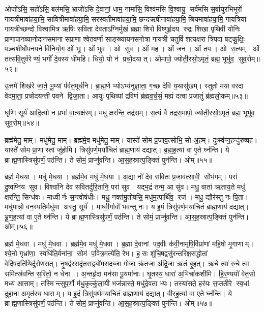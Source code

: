 ओजो॑ऽसि॒ सहो॑ऽसि॒ बल॑मसि॒ भ्राजो॑ऽसि दे॒वानां॒ धाम॒ नामा॑सि॒ विश्व॑मसि वि॒श्वायु॒ सर्व॑मसि स॒र्वायुरभिभूरों गायत्रीमावा॑हया॒मि॒ सावित्रीमावा॑हया॒मि॒ सरस्वतीमावा॑ह\-या॒मि॒ छन्दऋषीनावा॑हया॒मि॒ श्रियमावा॑हया॒मि॒ गायत्रिया गायत्रीच्छन्दो विश्वामित्र ऋषिः सविता देवताऽग्निर्मुखं ब्रह्मा शिरो विष्णुर्\mbox{}हृदय रुद्रः शिखा पृथिवी योनिः प्राणापानव्यानोदानसमाना सप्राणा श्वेतवर्णा साङ्ख्यायनसगोत्रा गायत्री चतुर्विशत्यक्षरा त्रिपदा॑ षट्कु॒क्षिः॒ पञ्चशीर्\mbox{}षोपनयने वि॑नियो॒ग॒ ओं भूः। 
ओं भुव। 
ओ सुव। 
ओं मह। 
ओं जन। 
ओं तप। 
ओ स॒त्यम्। 
ओं तत्स॑वि॒तुर्वरेण्यं॒ भर्गो॑ दे॒वस्य॑ धीमहि। 
धियो॒ यो न॑ प्रचो॒दयात्। 
ओमापो॒ ज्योती॒रसो॒ऽमृतं॒ ब्रह्म॒ भूर्भुव॒ सुव॒रोम्॥५२॥
\anuvakamend

उ॒त्तमे॑ शिख॑रे जा॒ते॒ भू॒म्यां प॑र्वत॒मूर्ध॑नि। 
ब्रा॒ह्म॒णेभ्योऽभ्य॑नु\-ज्ञा॒ता॒ ग॒च्छ दे॑वि य॒थासु॑खम्। 
स्तुतो मया वरदा वे॑दमा॒ता॒ प्रचोदयन्ती पवने द्विजा॒ता। 
आयुः पृथिव्यां द्रविणं ब्र॑ह्मव॒र्च॒सं॒ मह्यं दत्वा प्रजातुं ब्र॑ह्मलो॒कम्॥५३॥
\anuvakamend

घृणिः सूर्य॑ आदि॒त्यो न प्रभा॑ वा॒त्यक्ष॑रम्। 
मधु॑ क्षरन्ति॒ तद्र॑सम्। 
स॒त्यं वै तद्रस॒मापो॒ ज्योती॒रसो॒ऽमृतं॒ ब्रह्म॒ भूर्भुव॒ सुव॒रोम्॥५४॥\anuvakamend

ब्रह्म॑मेतु॒ माम्। 
मधु॑मेतु॒ माम्। 
ब्रह्म॑मे॒व मधु॑मेतु॒ माम्। 
यास्ते॑ सोम प्र॒जाव॒त्सोभि॒ सो अ॒हम्। 
दुःस्व॑प्न॒हन्दु॑रुष्षह। 
यास्ते॑ सोम प्रा॒णास्तां जु॑होमि। 
त्रिसु॑पर्ण॒मया॑चितं ब्राह्म॒णाय॑ दद्यात्। 
ब्र॒ह्म॒ह॒त्यां वा ए॒ते घ्न॑न्ति। 
ये ब्राह्म॒णास्त्रिसु॑पर्णं॒ पठ॑न्ति। 
ते सोमं॒ प्राप्नु॑वन्ति। 
आ॒स॒ह॒स्रात्प॒ङ्क्तिं पुन॑न्ति। 
ओम्॥५५॥
\anuvakamend

ब्रह्म॑ मे॒धया। 
मधु॑ मे॒धया। 
ब्रह्म॑मे॒व मधु॑ मे॒धया। 
अ॒द्या नो॑ देव सवितः प्र॒जाव॑त्सावी॒ सौभ॑गम्। 
परा॑ दु॒ष्वप्नि॑य सुव। 
विश्वा॑नि देव सवितर्दुरि॒तानि॒ परा॑ सुव। 
यद्भ॒द्रं तन्म॒ आ सु॑व। 
मधु॒ वाता॑ ऋताय॒ते मधु॑ क्षरन्ति॒ सिन्ध॑वः। 
माध्वीर्नः स॒न्त्वोष॑धीः। 
मधु॒ नक्त॑मु॒तोषसि॒ मधु॑म॒त्पार्थि॑व॒ रज॑। 
मधु॒ द्यौर॑स्तु नः पि॒ता। 
मधु॑मान्नो॒ वन॒स्पति॒र्मधु॑मा अस्तु॒ सूर्य॑। 
माध्वी॒र्गावो॑ भवन्तु नः। 
य इ॒मं त्रिसु॑पर्ण॒मया॑चितं ब्राह्म॒णाय॑ दद्यात्। 
भ्रू॒ण॒ह॒त्यां वा ए॒ते घ्न॑न्ति। 
ये ब्राह्म॒णास्त्रिसु॑पर्णं॒ पठ॑न्ति। 
ते सोमं॒ प्राप्नु॑वन्ति। 
आ॒स॒ह॒स्रात्प॒ङ्क्तिं पुन॑न्ति। 
ओम्॥५६॥
\anuvakamend


ब्रह्म॑ मे॒धवा। 
मधु॑ मे॒धवा। 
ब्रह्म॑मे॒व मधु॑ मे॒धवा। 
ब्र॒ह्मा दे॒वानां पद॒वीः क॑वी॒नामृषि॒र्विप्रा॑णां महि॒षो मृ॒गाणाम्। 
श्ये॒नो गृध्रा॑णा॒ स्वधि॑ति॒र्वना॑ना॒ सोम॑ प॒वित्र॒मत्ये॑ति॒ रेभ\sn{}। 
ह॒सः शु॑चि॒षद्वसु॑रन्तरिक्ष॒सद्धोता॑ वेदि॒षदति॑थिर्दुरोण॒सत्। 
नृ॒षद्व॑र॒सदृ॑त॒सद्व्यो॑म॒सद॒ब्जा गो॒जा ऋ॑त॒जा अ॑द्रि॒जा ऋ॒तं बृ॒हत्। 
ऋ॒चे त्वा॑ रु॒चे त्वा॒ समित्स्र॑वन्ति स॒रितो॒ न धेना। 
अ॒न्तर्\mbox{}हृ॒दा मन॑सा पू॒यमा॑नाः। 
घृ॒तस्य॒ धारा॑ अ॒भिचा॑कशीमि। 
हि॒र॒ण्ययो॑ वेत॒सो मध्य॑ आसाम्। 
\mbox{तस्मि\hspace{1ex}\hspace{-1ex}न्त्सु}\-प॒र्णो म॑धु॒कृत्कु॑ला॒यी भज॑न्नास्ते॒ मधु॑\-दे॒वताभ्यः। 
तस्या॑सते॒ हर॑यः स॒प्ततीरे स्व॒धां दुहा॑ना अ॒मृत॑स्य॒ धाराम्। 
य इ॒दं त्रिसु॑पर्ण॒मया॑चितं ब्राह्म॒णाय॑ दद्यात्। 
वी॒र॒ह॒त्यां वा ए॒ते घ्न॑न्ति। 
ये ब्राह्म॒णास्त्रिसु॑पर्णं॒ पठ॑न्ति। 
ते सोमं॒ प्राप्नु॑वन्ति। 
आ॒स॒ह॒स्रात्प॒ङ्क्तिं पुन॑न्ति। 
ओम्॥५७॥
\anuvakamend

